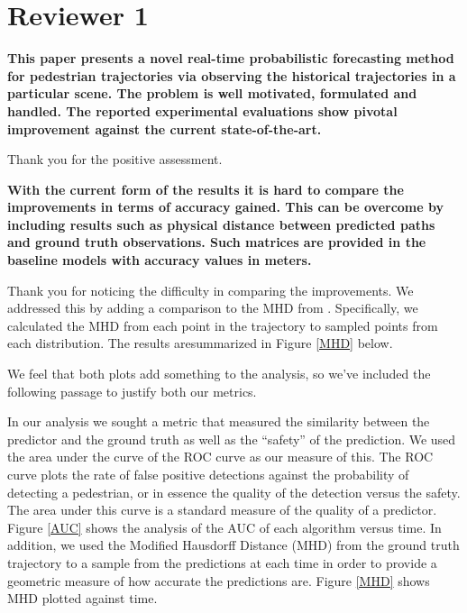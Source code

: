 \documentclass[usenames,dvipsnames]{article}
\providecommand{\response}[1]{
\noindent
\noindent\colorbox{gray!20}{
\parbox{\textwidth}{
\setlength{\parskip}{.1in}
\setlength{\parindent}{.1in}
#1}
}
}
\begin{document}
\section*{Reviewer 1}
\begin{enumerate}

\begin{item}
\textbf{This paper presents a novel real-time probabilistic forecasting method
for pedestrian trajectories via observing the historical trajectories
in a particular scene. The problem is well motivated, formulated and
handled. The reported experimental evaluations show pivotal improvement
against the current state-of-the-art.} 

Thank you for the positive assessment.
\end{item}

\begin{item}
\textbf{With the current form of the results it is hard to compare the
improvements in terms of accuracy gained. This can be overcome by
including results such as physical distance between predicted paths and
ground truth observations. Such matrices are provided in the baseline
models \cite{Kitani2012} \cite{Karasev2016} \cite{Robicquet2016} with accuracy values in meters. }

Thank you for noticing the difficulty in comparing the improvements. We addressed this by adding a comparison to the MHD from . Specifically, we calculated the MHD from each point in the trajectory to sampled points from each distribution. The results aresummarized in Figure \ref{MHD} below. 

We feel that both plots add something to the analysis, so we've included the following passage to justify both our metrics.

\response{ In our analysis we sought a metric that measured the similarity between the predictor and the ground truth as well as the ``safety'' of the prediction. We used the area under the curve of the ROC curve as our measure of this. The ROC curve plots the rate of false positive detections against the probability of detecting a pedestrian, or in essence the quality of the detection versus the safety. The area under this curve is a standard measure of the quality of a predictor. Figure \ref{AUC} shows the analysis of the AUC of each algorithm versus time. In addition, we used the Modified Hausdorff Distance (MHD) from the ground truth trajectory to a sample from the predictions at each time in order to provide a geometric measure of how accurate the predictions are. Figure \ref{MHD} shows MHD plotted against time.}


\end{item}
\end{enumerate}
\end{document}

